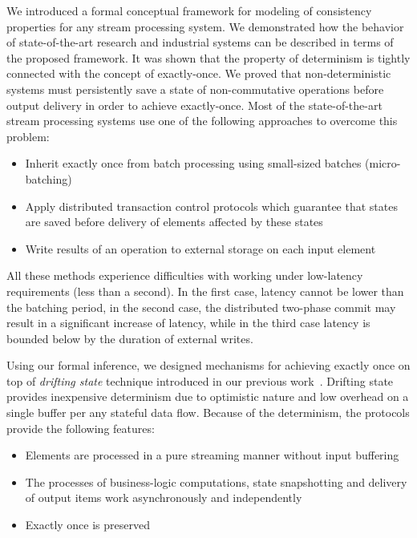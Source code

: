 
\label {fs-conclusion-seciton}

We introduced a formal conceptual framework for modeling of consistency properties for any stream processing system. We demonstrated how the behavior of state-of-the-art research and industrial systems can be described in terms of the proposed framework. It was shown that the property of determinism is tightly connected with the concept of exactly-once. We proved that non-deterministic systems must persistently save a state of non-commutative operations before output delivery in order to achieve exactly-once. Most of the state-of-the-art stream processing systems use one of the following approaches to overcome this problem: 

\begin{itemize}
    \item Inherit exactly once from batch processing using small-sized batches (micro-batching)
    \item Apply distributed transaction control protocols which guarantee that states are saved before delivery of elements affected by these states
    \item Write results of an operation to external storage on each input element
\end{itemize}

All these methods experience difficulties with working under low-latency requirements (less than a second). In the first case, latency cannot be lower than the batching period, in the second case, the distributed two-phase commit may result in a significant increase of latency, while in the third case latency is bounded below by the duration of external writes.

Using our formal inference, we designed mechanisms for achieving exactly once on top of {\em drifting state} technique introduced in our previous work~\cite{we2018adbis}. Drifting state provides inexpensive determinism due to optimistic nature and low overhead on a single buffer per any stateful data flow. Because of the determinism, the protocols provide the following features:

\begin{itemize}
    \item Elements are processed in a pure streaming manner without input buffering
    \item The processes of business-logic computations, state snapshotting and delivery of output items work asynchronously and independently
    \item Exactly once is preserved
\end{itemize}

